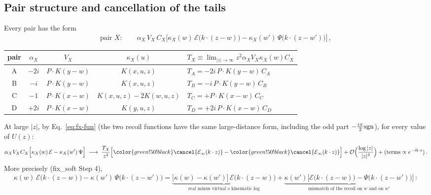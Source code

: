 {\subsection*{Pair structure and cancellation of the tails}
Every pair has the form
\begin{align}
\text{pair }X:\qquad \alpha_{X}\,V_{X}\,C_{X}\Big[\kappa_{X}(w)\,\mathcal{E}\big(k\cdot(z-w)\big)-\kappa_{X}(w')\,\Psi\big(k\cdot(z-w')\big)\Big]\,,\label{eq:fx-pair}
\end{align}
\begin{center}
\renewcommand{\arraystretch}{1.3}
\begin{tabular}{|c|c|c|c|l|}\hline
pair & $\alpha_{X}$ & $V_{X}$ & $\kappa_{X}(u)$ & $T_{X}\equiv\lim_{|z|\to\infty} z^{2}\alpha_{X}V_{X}\kappa_{X}(w)C_{X}$\\\hline
A & $-2i$ & $P\cdot K(y-w)$ & $K(x,u,z)$ & $T_{A}=-2i\,P\!\cdot\!K(y-w)\,C_{A}$\\
B & $-i$ & $P\cdot K(y-w)$ & $K(x,u,z)$ & $T_{B}=-i\,P\!\cdot\!K(y-w)\,C_{B}$\\
C & $-1$ & $P\cdot K(x-w)$ & $K(x,u,z)-2K(w,u,z)$ & $T_{C}=+P\!\cdot\!K(x-w)\,C_{C}$\\
D & $+2i$ & $P\cdot K(x-w)$ & $K(y,u,z)$ & $T_{D}=+2i\,P\!\cdot\!K(x-w)\,C_{D}$\\\hline
\end{tabular}
\end{center}
At large $|z|$, by Eq.~\eqref{eq:fx-fun} (the two recoil functions have the same large-distance form, including the odd part $-\frac{i\pi}{2}{\rm sgn}$), for every value of $U(z)$:
\begin{align}
\alpha_{X}V_{X}C_{X}\Big[\kappa_{X}(w)\,\mathcal{E}-\kappa_{X}(w')\,\Psi\Big]\;\longrightarrow\;\frac{T_{X}}{z^{2}}\Big[{\color{green!50!black}\cancel{\mathcal{E}_{\infty}(k\cdot z)}}-{\color{green!50!black}\cancel{\mathcal{E}_{\infty}(k\cdot z)}}\Big]+{\cal O}\Big(\frac{\log|z|}{|z|^{3}}\Big)+(\text{terms}\propto e^{-ik\cdot z})\,.\notag
\end{align}
More precisely (fix\_soft Step 4),
\begin{align}
\kappa(w)\,\mathcal{E}\big(k\cdot(z-w)\big)-\kappa(w')\,\Psi\big(k\cdot(z-w')\big)=\underbrace{\big[\kappa(w)-\kappa(w')\big]\,\mathcal{E}\big(k\cdot(z-w)\big)}_{\text{real minus virtual}\,\times\,\text{kinematic log}}+\underbrace{\kappa(w')\Big[\mathcal{E}\big(k\cdot(z-w)\big)-\Psi\big(k\cdot(z-w')\big)\Big]}_{\text{mismatch of the recoil on $w$ and on $w'$}}\,:\label{eq:fx-rmv}
\end{align}
}
